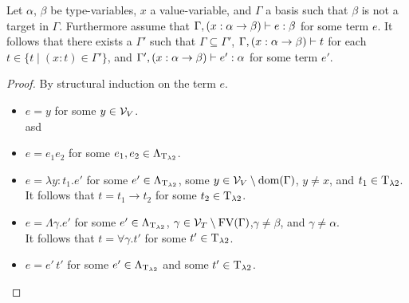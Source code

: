 \begin{claim}
Let $\alpha$, $\beta$ be type-variables, $x$ a value-variable, and $\Gamma$ a %
basis such that $\beta$ is not a target in $\Gamma$. %
Furthermore assume that $\Gamma,(x:\alpha\to\beta)\vdash e:\beta$ for some term $e$. It follows that there exists a $\Gamma'$ such that $\Gamma\subseteq\Gamma'$, $\Gamma,(x:\alpha\to\beta)\vdash t$ for each $t\in\{t\mid (x:t)\in\Gamma'\}$, and $\Gamma',(x:\alpha\to\beta)\vdash e':\alpha$ for some term $e'$. %
\end{claim}
\begin{proof}
By structural induction on the term $e$.
\begin{itemize}
	\item[] \underline{$e=y$} for some $y\in\mathcal{V}_V$.\\
		asd
	\item[] \underline{$e=e_1e_2$} for some $e_1,e_2\in\Lambda_{\text{T}_{\lambda2}}$.\\
		
		\begin{figure}[H]
			\centering
			
		\end{figure}
	\item[] \underline{$e=\lambda y:t_1.e'$} for some $e'\in\Lambda_{\text{T}_{\lambda2}}$, some $y\in\mathcal{V}_V\setminus\text{dom}(\Gamma)$, $y\neq x$, and $t_1\in\text{T}_{\lambda2}$.\\
		It follows that $t=t_1\to t_2$ for some $t_2\in\text{T}_{\lambda2}$.
		
		\begin{figure}[H]
			\centering
			
		\end{figure}
	\item[] \underline{$e=\Lambda\gamma.e'$} for some $e'\in\Lambda_{\text{T}_{\lambda2}}$, $\gamma\in\mathcal{V}_T\setminus\text{FV}(\Gamma)$,$\gamma\neq\beta$, and $\gamma\neq\alpha$.\\
		It follows that $t=\forall\gamma.t'$ for some $t'\in\text{T}_{\lambda2}$.
		
		\begin{figure}[H]
			\centering
			
		\end{figure}
	\item[] \underline{$e=e'\,t'$} for some $e'\in\Lambda_{\text{T}_{\lambda2}}$ and some $t'\in\text{T}_{\lambda2}$.\\
		
		\begin{figure}[H]
			\centering
			
		\end{figure}
\end{itemize}
\end{proof}